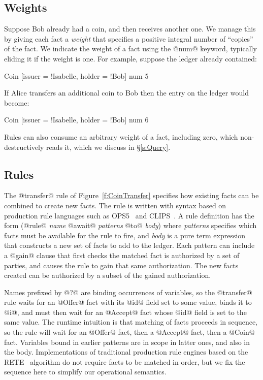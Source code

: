 \subsection{Weights}
\label{s:Weights}
Suppose Bob already had a coin, and then receives another one. We manage this by giving each fact a \emph{weight} that specifies a positive integral number of ``copies'' of the fact. We indicate the weight of a fact using the @num@ keyword, typically eliding it if the weight is one. For example, suppose the ledger already contained:
\begin{small}
\begin{code}
 Coin [issuer = !Isabelle, holder = !Bob]  num 5
\end{code}
\end{small}
%
If Alice transfers an additional coin to Bob then the entry on the ledger would become:
\begin{small}
\begin{code}
 Coin [issuer = !Isabelle, holder = !Bob]  num 6
\end{code}
\end{small}
%
Rules can also consume an arbitrary weight of a fact, including zero, which non-destructively reads it, which we discuss in \S\ref{s:Query}.


\subsection{Rules}
The @transfer@ rule of Figure~\ref{f:CoinTransfer} specifies how existing facts can be combined to create new facts. The rule is written with syntax based on production rule languages such as OPS5~\cite{Forgy1981:OPS5} and CLIPS~\cite{Riley2017:CLIPS}. A rule definition has the form (@rule@ \emph{name} @await@ \emph{patterns} @to@ \emph{body}) where \emph{patterns} specifies which facts must be available for the rule to fire, and \emph{body} is a pure term expression that constructs a new set of facts to add to the ledger. Each pattern can include a @gain@ clause that first checks the matched fact is authorized by a set of parties, and causes the rule to gain that same authorization. The new facts created can be authorized by a subset of the gained authorization.

Names prefixed by @?@ are binding occurrences of variables, so the @transfer@ rule waits for an @Offer@ fact with its @id@ field set to some value, binds it to @i@, and must then wait for an @Accept@ fact whose @id@ field is set to the same value. The runtime intuition is that matching of facts proceeds in sequence, so the rule will wait for an @Offer@ fact, then a @Accept@ fact, then a @Coin@ fact. Variables bound in earlier patterns are in scope in latter ones, and also in the body. Implementations of traditional production rule engines based on the RETE~\cite{Forgy1981:RETE} algorithm do not require facts to be matched in order, but we fix the sequence here to simplify our operational semantics.

